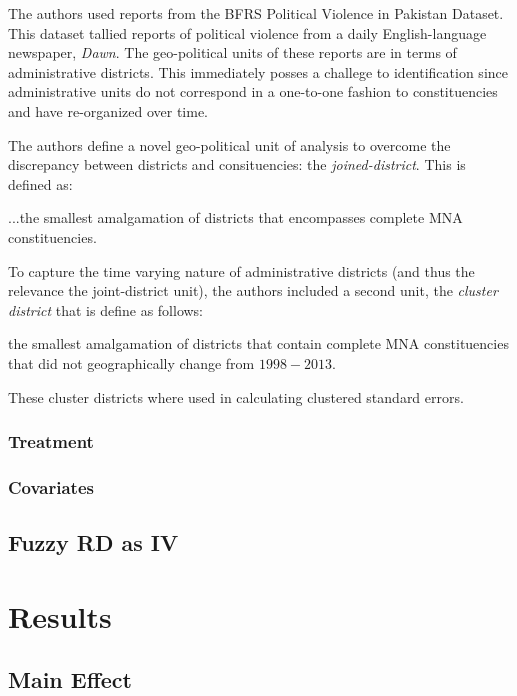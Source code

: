 \documentclass{scrartcl}
\begin{document}
The authors used reports from the BFRS Political Violence in Pakistan Dataset. This dataset tallied reports of political violence from a daily English-language newspaper, \textit{Dawn}. The geo-political units of these reports are in terms of administrative districts. This immediately posses a challege to identification since administrative units do not correspond in a one-to-one fashion to constituencies and have re-organized over time.

The authors define a novel geo-political unit of analysis to overcome the discrepancy between districts and consituencies: the \textit{joined-district}. 
This is defined as:
\begin{displayquote}
...the smallest amalgamation of districts that encompasses complete MNA constituencies. 
\end{displayquote}

To capture the time varying nature of administrative districts (and thus the relevance the joint-district unit), the authors included a second unit, the \textit{cluster district} that is define as follows:

\begin{displayquote}
the smallest amalgamation of districts that contain complete MNA constituencies that did not geographically change from $1998 - 2013$.
\end{displayquote}

These cluster districts where used in calculating clustered standard errors.

\subsubsection{Treatment}

\subsubsection{Covariates}

\subsection{Fuzzy RD as IV}


\section{Results}

\subsection{Main Effect}
\begin{center}
\footnotesize 
\end{center}{}
\end{document}

